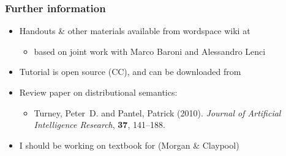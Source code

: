 \documentclass[t]{beamer} %
\begin{document}
\begin{frame}
  \frametitle{Further information}

  \begin{itemize}
  \item Handouts \& other materials available from wordspace wiki at
    \begin{center}
    \end{center}
    \begin{itemize}
    \item[\hand] based on joint work with Marco Baroni and Alessandro Lenci
    \end{itemize}
  \item Tutorial is open source (CC), and can be downloaded from
    \begin{center}\small
    \end{center}
    \gap[.5]
  \item Review paper on distributional semantics:
    \begin{itemize}
    \item[] \small\nocite{Turney:Pantel:10}
      Turney, Peter~D. and Pantel, Patrick (2010).
      {\em Journal of Artificial Intelligence Research}, {\bf 37}, 141--188.%
      \nocite{Turney:Pantel:10}
    \end{itemize}
    \gap[.5]
  \item I should be working on textbook  for  (Morgan \& Claypool)
  \end{itemize}

\end{frame}


\end{document}
